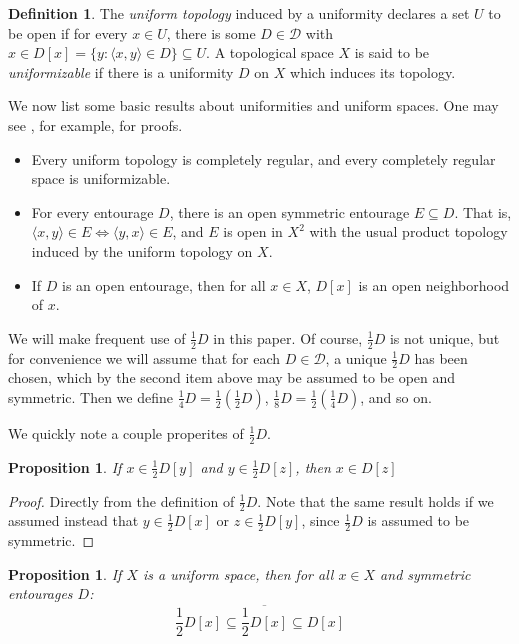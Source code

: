 \documentclass{amsart}
\newtheorem{prop}[thm]{Proposition}
\theoremstyle{definition}
\newtheorem{defn}[thm]{Definition}
\theoremstyle{remark}
\newcommand{\mc}{\mathcal}
\newcommand{\<}{\langle}
\renewcommand{\>}{\rangle}
\newcommand{\cl}[1]{\overline{#1}}
\newcommand{\term}{\textit}
\begin{document}
\begin{defn}
  The \term{uniform topology} induced by a uniformity declares a set $U$ to be open if for every $x\in U$, there is some $D\in\mc D$ with $x\in D[x]=\{y: \<x,y\>\in D\}\subseteq U$.   A topological space $X$ is said to be \term{uniformizable} if there is a uniformity $D$ on $X$ which induces its topology.
\end{defn}

We now list some basic results about uniformities and uniform spaces.  One may see \cite{e}, for example, for proofs.



\begin{itemize}
 \item Every uniform topology is completely regular, and every completely regular space is uniformizable.
\item  For every entourage $D$, there is an open symmetric entourage $E\subseteq D$. That is, $\<x,y\>\in E \Leftrightarrow \<y,x\> \in E$, and $E$ is open in $X^2$ with the usual product topology induced by the uniform topology on $X$.
\item  If $D$ is an open entourage, then for all $x\in X$, $D[x]$ is an open neighborhood of $x$.
\end{itemize}

We will make frequent use of $\frac{1}{2}D$ in this paper.  Of course, $\frac{1}{2}D$ is not unique, but for convenience we will assume that for each $D\in \mathcal D$, a unique $\frac{1}{2}D$ has been chosen, which  by the second item above may be assumed to be open and symmetric.  Then we define $\frac{1}{4}D=\frac{1}{2}(\frac{1}{2}D)$,
$\frac{1}{8}D=\frac{1}{2}(\frac{1}{4}D)$, and so on.

We quickly note a couple properites of $\frac{1}{2}D$.

\begin{prop}
  If $x\in \frac{1}{2}D[y]$ and $y\in \frac{1}{2}D[z]$, then $x\in D[z]$
\end{prop}

\begin{proof}
  Directly from the definition of $\frac{1}{2}D$. Note that the same result holds if we assumed instead that $y\in \frac{1}{2}D[x]$ or $z\in \frac{1}{2}D[y]$, since $\frac{1}{2}D$ is assumed to be symmetric.
\end{proof}

\begin{prop}
  If $X$ is a uniform space, then for all $x\in X$ and symmetric entourages $D$:
    \[
      \frac{1}{2}D[x]\subseteq \cl{\frac{1}{2}D[x]}\subseteq D[x]
    \]
\end{prop}
\end{document}
